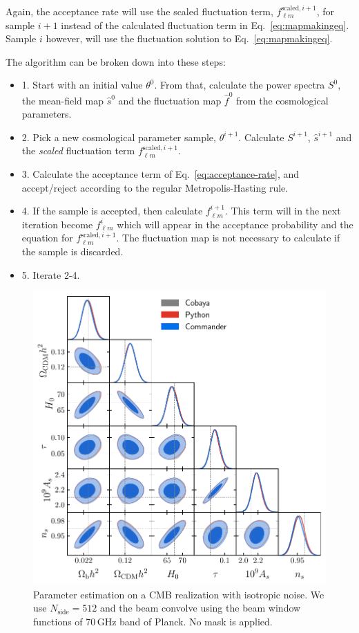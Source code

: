 \documentclass[twocolumn]{../common/aa}
\begin{document}
Again, the acceptance rate will use the scaled fluctuation term, $f_{\ell m}^{\textrm{scaled}, i+1}$, for sample $i+1$ instead of the calculated fluctuation term in Eq.~\eqref{eq:mapmakingeq}. Sample $i$ however, will use the fluctuation solution to Eq.~\eqref{eq:mapmakingeq}.

The algorithm can be broken down into these steps:
\begin{itemize}
    \item 1. Start with an initial value $\theta^0$. From that, calculate the power spectra $S^0$, the mean-field map $\hat{s}^0$ and the fluctuation map $\hat{f}^0$ from the cosmological parameters.
    \item 2. Pick a new cosmological parameter sample, $\theta^{i+1}$. Calculate $S^{i+1}$, $\hat{s}^{i+1}$ and the \textit{scaled} fluctuation term $f_{\ell m}^{\textrm{scaled}, i+1}$.
    \item 3. Calculate the acceptance term of Eq.~\ref{eq:acceptance-rate}, and accept/reject according to the regular Metropolis-Hasting rule.
    \item 4. If the sample is accepted, then calculate $f_{\ell m}^{i+1}$. This term will in the next iteration become $f_{\ell m}^{i}$ which will appear in the acceptance probability and the equation for $f_{\ell m}^{\textrm{scaled}, i+1}$. The fluctuation map is not necessary to calculate if the sample is discarded.
    \item 5. Iterate 2-4.
\end{itemize}

\begin{figure}
	\centering
	\includegraphics[width=\linewidth]{figures/dist_posterior_no_mask.pdf}
	\caption{\label{fig:nomask}Parameter estimation on a CMB realization with isotropic noise. We use $N_{\mathrm{side}}=512$ and the beam convolve using the beam window functions of 70\,GHz band of Planck. No mask is applied.}
\end{figure}
\end{document}
